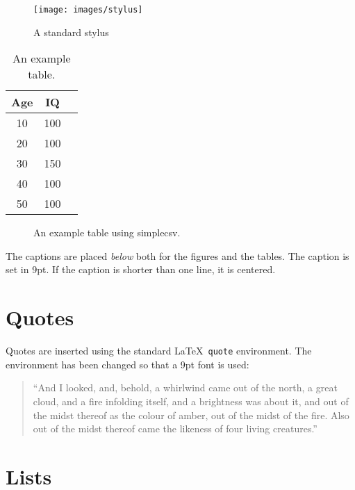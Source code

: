 \begin{figure}[htbp]  %
  \centering
  \texttt{[image: images/stylus]}
  \caption[Stylus]{A standard stylus}
  \label{fig:stylus}
\end{figure}



\begin{table}[tbp]
  \centering
  \begin{tabular}{c|c|c}
    Age  & IQ  & \\ 
    \hline
    10   & 100 \\
    20   & 100 \\
    30   & 150 \\
    40   & 100 \\
    50   & 100
  \end{tabular}
  \caption{An example table.}
  \label{tab:example1}
\end{table}

\begin{figure}[tbp]
  \centering
  \caption{An example table using simplecsv.}
  \label{tab:examplecsv}
\end{figure}

The captions are placed \emph{below} both for the figures and the
tables. The caption is set in 9pt. If the caption is shorter than one
line, it is centered.

\section{Quotes}
\label{sec:Quotes} %

Quotes are inserted using the standard \LaTeX\ \texttt{quote}
environment. The environment has been changed so that a 9pt font is
used:

\begin{quote}
  ``And I looked, and, behold, a whirlwind came out of the north, a
  great cloud, and a fire infolding itself, and a brightness was about
  it, and out of the midst thereof as the colour of amber, out of the
  midst of the fire. Also out of the midst thereof came the likeness
  of four living creatures.''
\end{quote}

\section{Lists}
\label{sec:lists}

